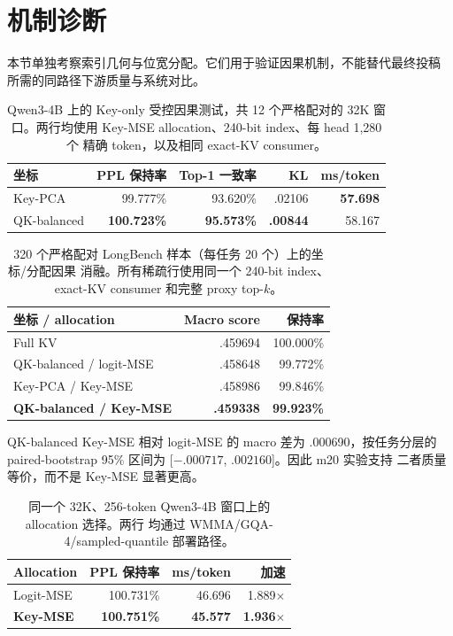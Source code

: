 \section{机制诊断}
\label{app:mechanism-results}

本节单独考察索引几何与位宽分配。它们用于验证因果机制，不能替代最终投稿
所需的同路径下游质量与系统对比。

\begin{table}[H]
\caption{Qwen3-4B 上的 Key-only 受控因果测试，共 12 个严格配对的 32K
窗口。两行均使用 Key-MSE allocation、240-bit index、每 head 1,280 个
精确 token，以及相同 exact-KV consumer。}
\label{tab:key-only-causal}
\centering
\begin{tabular}{lrrrr}
\toprule
坐标 & PPL 保持率 & Top-1 一致率 & KL & ms/token \\
\midrule
Key-PCA & 99.777\% & 93.620\% & .02106 & \textbf{57.698} \\
QK-balanced & \textbf{100.723\%} & \textbf{95.573\%} &
\textbf{.00844} & 58.167 \\
\bottomrule
\end{tabular}
\end{table}

\begin{table}[H]
\caption{320 个严格配对 LongBench 样本（每任务 20 个）上的坐标/分配因果
消融。所有稀疏行使用同一个 240-bit index、exact-KV consumer 和完整
proxy top-$k$。}
\label{tab:allocation-causal}
\centering
\begin{tabular}{lrr}
\toprule
坐标 / allocation & Macro score & 保持率 \\
\midrule
Full KV & .459694 & 100.000\% \\
QK-balanced / logit-MSE & .458648 & 99.772\% \\
Key-PCA / Key-MSE & .458986 & 99.846\% \\
\textbf{QK-balanced / Key-MSE} & \textbf{.459338} & \textbf{99.923\%} \\
\bottomrule
\end{tabular}
\end{table}

QK-balanced Key-MSE 相对 logit-MSE 的 macro 差为 .000690，按任务分层的
paired-bootstrap 95\% 区间为 [$-.000717$, $.002160$]。因此 m20 实验支持
二者质量等价，而不是 Key-MSE 显著更高。

\begin{table}[H]
\caption{同一个 32K、256-token Qwen3-4B 窗口上的 allocation 选择。两行
均通过 WMMA/GQA-4/sampled-quantile 部署路径。}
\label{tab:allocation-deploy}
\centering
\begin{tabular}{lrrr}
\toprule
Allocation & PPL 保持率 & ms/token & 加速 \\
\midrule
Logit-MSE & 100.731\% & 46.696 & 1.889$\times$ \\
\textbf{Key-MSE} & \textbf{100.751\%} & \textbf{45.577} &
\textbf{1.936$\times$} \\
\bottomrule
\end{tabular}
\end{table}

